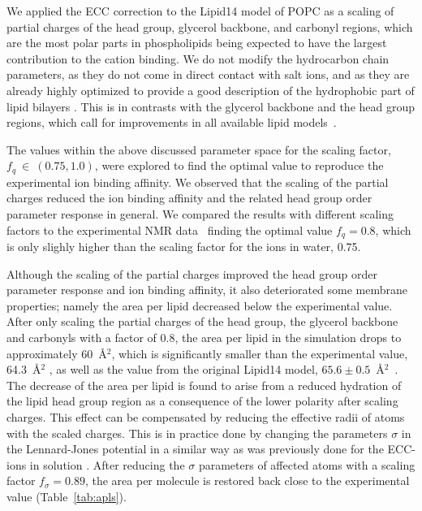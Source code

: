 \documentclass[aip,jcp,twocolumn]{revtex4}
\begin{document}
We applied the ECC correction to the Lipid14 model of POPC as a scaling of partial charges of the head group,
glycerol backbone, and carbonyl regions, which are the most polar parts in phospholipids
being expected to have the largest contribution to the cation binding.
We do not modify the hydrocarbon chain parameters, 
as they do not come in direct contact with salt ions, 
and as they are already highly optimized to provide a good description of the
hydrophobic part of lipid bilayers \cite{dickson14,ollila16}.
This is in contrasts with the glycerol backbone and the head group regions, 
which call for improvements in all available lipid models~\cite{botan15}.

The values within the above discussed parameter space for the scaling factor, $f_q~\in~(0.75, 1.0)$,
were explored to find the optimal value to reproduce the experimental ion binding affinity.
We observed that the scaling
of the partial charges reduced the ion binding affinity and the 
related head group order parameter response in general.
We compared the results with different scaling factors to the experimental 
NMR data~\cite{akutsu81,altenbach84,scherer89} finding the optimal 
value $f_q = 0.8$,
which is only slighly higher than the scaling factor for the ions in water, 0.75.

Although the scaling of the partial charges improved 
the head group order parameter response and ion binding affinity,
it also deteriorated some membrane properties; 
namely the area per lipid decreased below the experimental value. 
After only scaling the partial charges of the head group, the glycerol
backbone and carbonyls with a factor of 0.8, 
the area per lipid in the simulation drops to approximately 60~\AA$^2$,
which is significantly smaller than the experimental value, 64.3~\AA$^2$ \cite{kucerka11}, 
as well as the value from the original Lipid14 model, $65.6 \pm 0.5$~\AA$^2$~\cite{dickson14}.
The decrease of the area per lipid is found to arise from a reduced hydration of the lipid head group region
as a consequence of the lower polarity after scaling charges. 
This effect can be compensated
by reducing the effective radii of atoms with the scaled charges.
This is in practice done by changing the parameters $\sigma$ in the Lennard-Jones potential 
in a similar way as was previously done for the ECC-ions in solution \cite{kohagen14,kohagen16,Pluharova2014}.
After reducing the $\sigma$ parameters of affected atoms with a scaling factor $f_\sigma = 0.89$, 
the area per molecule is restored
back close to the experimental value (Table~\ref{tab:apls}). 
\end{document}
